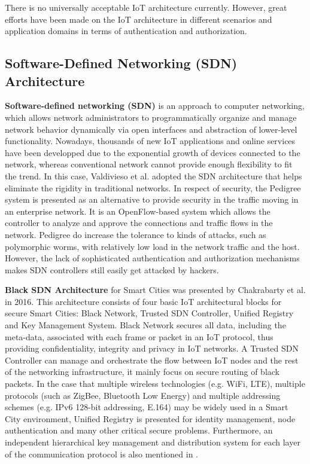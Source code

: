There is no universally acceptable IoT architecture currently. However, great efforts have been made on the IoT architecture in different scenarios and application domains in terms of authentication and authorization.
\subsection{Software-Defined Networking (SDN) Architecture}
\textbf{Software-defined networking (SDN)} is an approach to computer networking, which allows network administrators to programmatically organize and manage network behavior dynamically via open interfaces and abstraction of lower-level functionality. Nowadays, thousands of new IoT applications and online services have been developped due to the exponential growth of devices connected to the network, whereas conventional network cannot provide enough flexibility to fit the trend. In this case, Valdivieso et al.\cite{valdivieso2014sdn} adopted the SDN architecture that helps eliminate the rigidity in traditional networks. In respect of security, the Pedigree system\cite{ramachandran2009securing} is presented as an alternative to provide security in the traffic moving in an enterprise network. It is an OpenFlow-based system which allows the controller to analyze and approve the connections and traffic flows in the network. Pedigree do increase the tolerance to kinds of attacks, such as polymorphic worms, with relatively low load in the network traffic and the host. However, the lack of sophisticated authentication and authorization mechanisms makes SDN controllers still easily get attacked by hackers.

\textbf{Black SDN Architecture} for Smart Cities was presented by Chakrabarty et al.\cite{chakrabarty2016secure} in 2016. This architecture consists of four basic IoT architectural blocks for secure Smart Cities: Black Network, Trusted SDN Controller, Unified Registry and Key Management System. Black Network secures all data, including the meta-data, associated with each frame or packet in an IoT protocol\cite{chakrabarty2015black}, thus providing confidentiality, integrity and privacy in IoT networks. A Trusted SDN Controller can manage and orchestrate the flow between IoT nodes and the rest of the networking infrastructure, it mainly focus on secure routing of black packets. In the case that multiple wireless technologies (e.g. WiFi, LTE), multiple protocols (such as ZigBee, Bluetooth Low Energy) and multiple addressing schemes (e.g. IPv6 128-bit addressing, E.164) may be widely used in a Smart City environment, Unified Registry is presented for identity management, node authentication and many other critical secure problems. Furthermore, an independent hierarchical key management and distribution system for each layer of the communication protocol is also mentioned in \cite{chakrabarty2016secure}.

